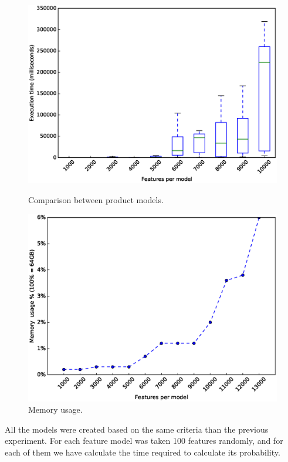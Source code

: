 \begin{figure}[h]
	\centering
	\begin{minipage}[b]{0.48\textwidth}
		\includegraphics[width=\textwidth]{boxplot_0_2.eps}
		\caption{Comparison between product models.}\label{fig:plot:probs:boxplot}
	\end{minipage}
	\hfill
	\begin{minipage}[b]{0.48\textwidth}
		\includegraphics[width=\textwidth]{boxplot_mem.eps}
		\caption{Memory usage.}\label{fig:plot:probs:boxplotmem}
	\end{minipage}
\end{figure}


All the models were created based on the
same criteria than the previous experiment.
For each feature model was taken 100 features
randomly, and for each of them we have calculate the 
time required to calculate its
probability.





